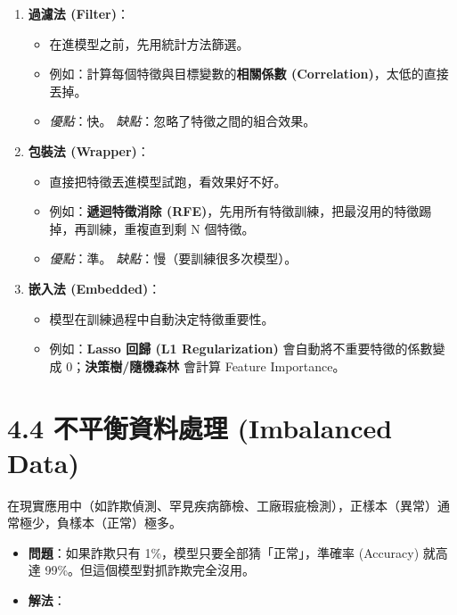 \documentclass[
  letterpaper,
  DIV=11,
  numbers=noendperiod]{scrreprt}
\providecommand{\tightlist}{%
  \setlength{\itemsep}{0pt}\setlength{\parskip}{0pt}}
\begin{document}
\begin{enumerate}
\def\labelenumi{\arabic{enumi}.}
\tightlist
\item
  \textbf{過濾法 (Filter)}：

  \begin{itemize}
  \tightlist
  \item
    在進模型之前，先用統計方法篩選。
  \item
    例如：計算每個特徵與目標變數的\textbf{相關係數
    (Correlation)}，太低的直接丟掉。
  \item
    \emph{優點}：快。 \emph{缺點}：忽略了特徵之間的組合效果。
  \end{itemize}
\item
  \textbf{包裝法 (Wrapper)}：

  \begin{itemize}
  \tightlist
  \item
    直接把特徵丟進模型試跑，看效果好不好。
  \item
    例如：\textbf{遞迴特徵消除
    (RFE)}，先用所有特徵訓練，把最沒用的特徵踢掉，再訓練，重複直到剩 N
    個特徵。
  \item
    \emph{優點}：準。 \emph{缺點}：慢（要訓練很多次模型）。
  \end{itemize}
\item
  \textbf{嵌入法 (Embedded)}：

  \begin{itemize}
  \tightlist
  \item
    模型在訓練過程中自動決定特徵重要性。
  \item
    例如：\textbf{Lasso 回歸 (L1 Regularization)}
    會自動將不重要特徵的係數變成 0；\textbf{決策樹/隨機森林} 會計算
    Feature Importance。
  \end{itemize}
\end{enumerate}

\chapter{4.4 不平衡資料處理 (Imbalanced
Data)}\label{sec-imbalanced-data}

在現實應用中（如詐欺偵測、罕見疾病篩檢、工廠瑕疵檢測），正樣本（異常）通常極少，負樣本（正常）極多。

\begin{itemize}
\tightlist
\item
  \textbf{問題}：如果詐欺只有 1\%，模型只要全部猜「正常」，準確率
  (Accuracy) 就高達 99\%。但這個模型對抓詐欺完全沒用。
\item
  \textbf{解法}：
\end{itemize}
\end{document}
